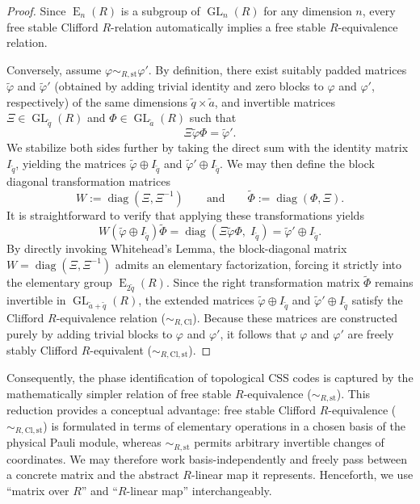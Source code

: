 \documentclass[aps,prx,english,superscriptaddress,twocolumn,tightenlines,showpacs,longbibliography,floatfix,amsfonts]{revtex4-2}
\theoremstyle{remark}
\theoremstyle{definition}
\begin{document}
\begin{proof}
		Since $\operatorname{E}_n(R)$ is a subgroup of $\operatorname{GL}_n(R)$ for any dimension $n$, every free stable Clifford \(R\)-relation automatically implies a free stable \(R\)-equivalence relation.

		Conversely, assume $\varphi \sim_{R,\mathrm{st}} \varphi'$. By definition, there exist suitably padded matrices $\tilde{\varphi}$ and $\tilde{\varphi}'$ (obtained by adding trivial identity and zero blocks to $\varphi$ and $\varphi'$, respectively) of the same dimensions $\tilde{q} \times \tilde{a}$, and invertible matrices $\Xi \in \operatorname{GL}_{\tilde{q}}(R)$ and $\Phi \in \operatorname{GL}_{\tilde{a}}(R)$ such that
	\begin{equation}
		\Xi \tilde{\varphi} \Phi = \tilde{\varphi}'.
	\end{equation}
	We stabilize both sides further by taking the direct sum with the identity matrix $I_{\tilde{q}}$, yielding the matrices $\tilde{\varphi} \oplus I_{\tilde{q}}$ and $\tilde{\varphi}' \oplus I_{\tilde{q}}$. We may then define the block diagonal transformation matrices
	\begin{equation}
		W := \operatorname{diag}(\Xi, \Xi^{-1})
		\qquad \text{and} \qquad
		\tilde{\Phi} := \operatorname{diag}(\Phi, \Xi).
	\end{equation}
	It is straightforward to verify that applying these transformations yields
	\begin{equation}
		W (\tilde{\varphi} \oplus I_{\tilde{q}}) \tilde{\Phi}
		= \operatorname{diag}(\Xi \tilde{\varphi} \Phi,\; I_{\tilde{q}})
		= \tilde{\varphi}' \oplus I_{\tilde{q}}.
	\end{equation}
	By directly invoking Whitehead's Lemma, the block-diagonal matrix $W = \operatorname{diag}(\Xi, \Xi^{-1})$ admits an elementary factorization, forcing it strictly into the elementary group $\operatorname{E}_{2\tilde{q}}(R)$. Since the right transformation matrix $\tilde{\Phi}$ remains invertible in $\operatorname{GL}_{\tilde{a}+\tilde{q}}(R)$, the extended matrices $\tilde{\varphi} \oplus I_{\tilde{q}}$ and $\tilde{\varphi}' \oplus I_{\tilde{q}}$ satisfy the Clifford \(R\)-equivalence relation ($\sim_{R,\mathrm{Cl}}$). Because these matrices are constructed purely by adding trivial blocks to $\varphi$ and $\varphi'$, it follows that $\varphi$ and $\varphi'$ are freely stably Clifford \(R\)-equivalent ($\sim_{R,\mathrm{Cl},\mathrm{st}}$).
\end{proof}

Consequently, the phase identification of
topological CSS codes is captured by the mathematically simpler relation of
free stable \(R\)-equivalence (\(\sim_{R,\mathrm{st}}\)). This reduction provides a conceptual advantage: free stable Clifford \(R\)-equivalence
(\(\sim_{R,\mathrm{Cl},\mathrm{st}}\)) is formulated in terms of elementary operations in a chosen basis of the physical Pauli module, whereas \(\sim_{R,\mathrm{st}}\) permits arbitrary invertible changes of coordinates.
We may therefore work basis-independently and freely pass between a concrete matrix and the abstract \(R\)-linear map it represents. Henceforth, we use ``matrix over \(R\)'' and ``\(R\)-linear map'' interchangeably.
\end{document}
